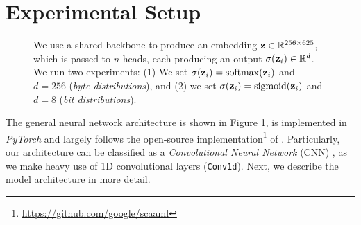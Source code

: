 \section{Experimental Setup}
\label{sec:dlsca_exp}
\begin{figure}[ht]
    \makebox[\textwidth][c]{
        \scalebox{0.85}{
            
        }
    }%

    \caption{We use a shared backbone to produce an embedding $\mathbf{z} \in \mathbb{R}^{256 \times 625}$, which is passed to $n$ heads, each producing an output $\sigma(\mathbf{z}_i) \in \mathbb{R}^d$. We run two experiments: (1) We set $\sigma(\mathbf{z}_i) = \operatorname{softmax}(\mathbf{z}_i)$ and $d=256$ (\emph{byte distributions}), and (2) we set $\sigma(\mathbf{z}_i) = \operatorname{sigmoid}(\mathbf{z}_i)$ and $d=8$ (\emph{bit distributions}).}
    \label{fig:convnet}
\end{figure}

The general neural network architecture is shown in Figure \ref{fig:convnet}, is implemented in \emph{PyTorch} \cite{pytorch} and largely follows the open-source implementation\footnote{\url{https://github.com/google/scaaml}} of \cite{dlsca_defcon}. Particularly, our architecture can be classified as a \emph{Convolutional Neural Network} (CNN) \cite{cnn_fukushima, cnn_lecun}, as we make heavy use of 1D convolutional layers (\texttt{Conv1d}). Next, we describe the model architecture in more detail.

